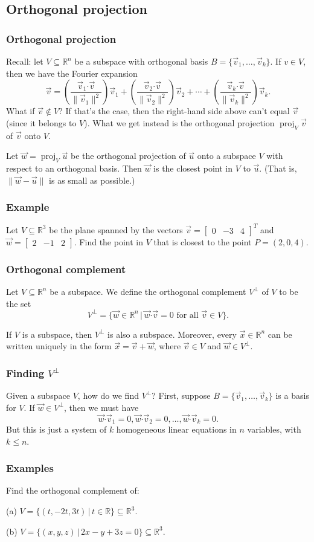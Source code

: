 \documentclass[11pt,t]{beamer}
\newcommand{\R}{\mathbb{R}}
\newcommand{\len}[1]{\lVert #1\rVert}
\newcommand{\dotp}{\boldsymbol{\cdot}}
\begin{document}
\subsection{Orthogonal projection}
\begin{frame}\frametitle{Orthogonal projection}
 Recall: let $V\subseteq \R^n$ be a subspace with orthogonal basis $B= \{\vec{v}_1,\ldots, \vec{v}_k\}$. If $v\in V$, then we have the Fourier expansion
\[
 \vec{v} = \left(\frac{\vec{v}_1\dotp\vec{v}}{\len{\vec{v}_1}^2}\right)\vec{v}_1+\left(\frac{\vec{v}_2\dotp\vec{v}}{\len{\vec{v}_2}^2}\right)\vec{v}_2+\cdots +\left(\frac{\vec{v}_k\dotp\vec{v}}{\len{\vec{v}_k}^2}\right)\vec{v}_k.
\]
What if $\vec{v}\notin V$? If that's the case, then the right-hand side above can't equal $\vec{v}$ (since  it belongs to $V$). What we get instead is the \alert{orthogonal projection} $\operatorname{proj}_V\vec{v}$ of $\vec{v}$ onto $V$.
\begin{theorem}
 Let $\vec{w}=\operatorname{proj}_V\vec{u}$ be the orthogonal projection of $\vec{u}$ onto a subspace $V$ with respect to an orthogonal basis. Then $\vec{w}$ is the closest point in $V$ to $\vec{u}$. (That is, $\len{\vec{w}-\vec{u}}$ is as small as possible.)
\end{theorem}

\end{frame}
\begin{frame}\frametitle{Example}
 Let $V\subseteq \R^3$ be the plane spanned by the vectors $\vec{v} = \begin{bmatrix}0&-3&4\end{bmatrix}^T$ and $\vec{w} = \begin{bmatrix}2&-1&2\end{bmatrix}$. Find the point in $V$ that is closest to the point $P=(2,0,4)$.
\end{frame}
\begin{frame}\frametitle{Orthogonal complement}
 Let $V\subseteq \R^n$ be a subspace. We define the \alert{orthogonal complement} $V^\bot$ of $V$ to be the set
\[
 V^\bot = \{\vec{w}\in \R^n \,|\, \vec{w}\dotp\vec{v} = 0 \text{ for all }\vec{v}\in V\}.
\]
 \begin{theorem}
  If $V$ is a subspace, then $V^\bot$ is also a subspace. Moreover, every $\vec{x}\in\R^n$ can be written \alert{uniquely} in the form $\vec{x} = \vec{v}+\vec{w}$, where $\vec{v}\in V$ and $\vec{w}\in V^\bot$.
 \end{theorem}
 
\end{frame}
\begin{frame}\frametitle{Finding $V^\bot$}
 Given a subspace $V$, how do we find $V^\bot$? First, suppose $B=\{\vec{v}_1,\ldots, \vec{v}_k\}$ is a basis for $V$. If $\vec{w}\in V^\bot$, then we must have
\[
 \vec{w}\dotp \vec{v}_1 = 0, \vec{w}\dotp \vec{v}_2 = 0,\ldots, \vec{w}\dotp\vec{v}_k=0.
\]
But this is just a system of $k$ \alert{homogeneous} linear equations in $n$ variables, with $k\leq n$.
\end{frame}
\begin{frame}\frametitle{Examples}
 Find the orthogonal complement of:

(a) $V = \{(t,-2t,3t)\,|\,t\in\R\}\subseteq \R^3$.

(b) $V = \{(x,y,z)\,|\, 2x-y+3z=0\}\subseteq \R^3$.

\end{frame}
\end{document}
